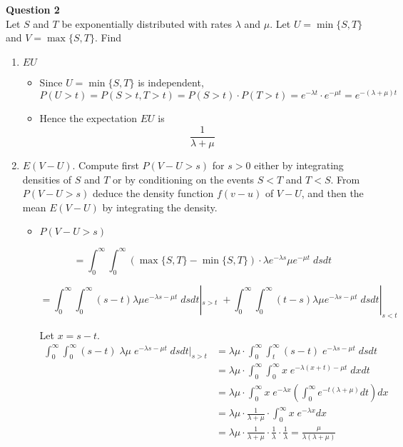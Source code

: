 \documentclass[12pt]{article}
\begin{document}
\newpage
\textbf{Question 2}\\
Let $S$ and $T$ be exponentially distributed with rates $\lambda$ and $\mu$. Let $U= \min\{S,T\}$ and $V=\max\{S,T\}$. Find
\begin{enumerate}[label=(\alph*)]
    \item $EU$
    \begin{itemize}
        \item Since $U=\min\{S,T\}$ is independent, 
        $$P(U>t) = P(S>t,T>t) = P(S>t)\cdot P(T>t) =e^{-\lambda t}\cdot e^{-\mu t} = e^{-(\lambda+\mu) t}$$
        
        \item Hence the expectation $EU$ is
        $$\frac{1}{\lambda+\mu}$$
        
        
    \end{itemize}
    
    \item $E(V-U)$. Compute first $P(V-U > s)$ for $s>0$ either by integrating densities of $S$ and $T$ or by conditioning on the events $S<T$ and $T<S$. From $P(V-U>s)$ deduce the density function $f(v-u)$ of $V-U$, and then the mean $E(V-U)$ by integrating the density.
    
    \begin{itemize}
            \item $P(V-U>s)$
            
            $$=\int_0^\infty \int_0^\infty (\max\{S,T\}-\min\{S,T\})\cdot \lambda e^{-\lambda s}\mu e^{-\mu t}\;dsdt$$        
            
            $$=\int_0^\infty \int_0^\infty (s-t)\lambda \mu e^{-\lambda s -\mu t} \;dsdt \left|_{ s>t }\; 
            + \int_0^\infty \int_0^\infty (t-s) \lambda\mu e^{-\lambda s -\mu t}\;dsdt\right|_{s<t}$$
            
            \vspace{1\baselineskip}
            Let $x= s-t$.
        \begin{align}
            \int_0^\infty \int_0^\infty (s-t)\; \lambda \mu\; e^{-\lambda s -\mu t} \;dsdt \rvert_{ s>t } &= \lambda\mu\cdot\int_0^\infty \int_t^\infty (s-t)\;e^{-\lambda s -\mu t} \;dsdt \\
            &= \lambda\mu\cdot\int_0^\infty \int_0^\infty x\;e^{-\lambda (x+t) -\mu t} \;dxdt  \nonumber\\ \nonumber
            &= \lambda\mu\cdot \int_0^\infty x\;e^{-\lambda x}\left(\int_0^\infty e^{-t(\lambda +\mu)}dt \right)dx      \\ \nonumber
            &=\lambda\mu\cdot\frac{1}{\lambda+\mu} \cdot \int_0^\infty x\;e^{-\lambda x}dx\\ \nonumber
            &=\lambda\mu\cdot\frac{1}{\lambda+\mu}\cdot\frac{1}{\lambda}\cdot \frac{1}{\lambda}
            =\frac{\mu}{\lambda(\lambda+\mu)}  \nonumber
        \end{align}
        

\end{itemize}
\end{enumerate}
\end{document}
